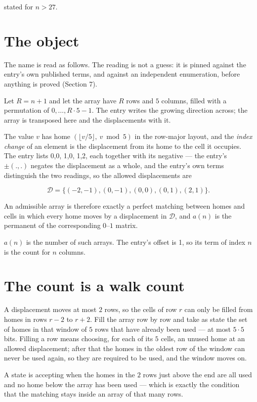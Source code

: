 \documentclass[11pt]{article}
\theoremstyle{definition}
\begin{document}
stated for $n > 27$.

\section{The object}

The name is read as follows. The reading is not a guess: it is pinned against the entry's own published terms, and against an independent enumeration, before anything is proved (Section 7).

Let $R = n + 1$ and let the array have $R$ rows and $5$ columns, filled with a permutation of $0,\dots,R\cdot5-1$. The entry writes the growing direction across; the array is transposed here and the displacements with it.

The value $v$ has home $(\lfloor v/5\rfloor,\ v \bmod 5)$ in the row-major layout, and the {\itshape index change} of an element is the displacement from its home to the cell it occupies. The entry lists 0,0, 1,0, 1,2, each together with its negative --- the entry's $\pm(.,.)$ negates the displacement as a whole, and the entry's own terms distinguish the two readings, so the allowed displacements are

\[\mathcal{D} = \{(-2,-1), (0,-1), (0,0), (0,1), (2,1)\}.\]

An admissible array is therefore exactly a perfect matching between homes and cells in which every home moves by a displacement in $\mathcal{D}$, and $a(n)$ is the permanent of the corresponding $0$--$1$ matrix.

$a(n)$ is the number of such arrays. The entry's offset is 1, so its term of index $n$ is the count for $n$ columns.

\section{The count is a walk count}

A displacement moves at most $2$ rows, so the cells of row $r$ can only be filled from homes in rows $r-2$ to $r+2$. Fill the array row by row and take as state the set of homes in that window of $5$ rows that have already been used --- at most $5\cdot5$ bits. Filling a row means choosing, for each of its $5$ cells, an unused home at an allowed displacement; after that the homes in the oldest row of the window can never be used again, so they are required to be used, and the window moves on.

A state is accepting when the homes in the $2$ rows just above the end are all used and no home below the array has been used --- which is exactly the condition that the matching stays inside an array of that many rows.
\end{document}
